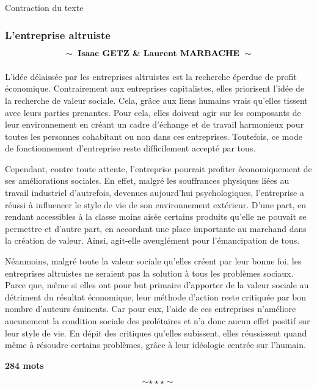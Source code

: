 \newpage\begin{bclogo}[barre=none,logo={}]{Contraction du texte} 
	\begin{center}
		\subsubsection*{L'entreprise altruiste  $$\sim\ \text{{\bfseries Isaac GETZ \& Laurent MARBACHE}}\ \sim$$}
	\end{center}
\end{bclogo}

	\hspace*{0.5cm}L'idée délaissée par les entreprises altruistes est la recherche éperdue de profit économique. Contrairement aux entreprises capitalistes, elles priorisent l'idée de la recherche de valeur sociale. Cela, grâce aux liens humains vrais qu'elles tissent avec leurs parties prenantes. Pour cela, elles doivent agir sur les composants de leur environnement en créant un cadre d'échange et de travail harmonieux pour toutes les personnes cohabitant ou non dans ces entreprises. Toutefois, ce mode de fonctionnement d'entreprise reste difficilement accepté par tous.\newline
	
	\hspace*{0.5cm}Cependant, contre toute attente, l'entreprise pourrait profiter économiquement de ses améliorations sociales. En effet, malgré les souffrances physiques liées au travail industriel d'autrefois, devenues aujourd'hui psychologiques, l'entreprise a réussi à influencer le style de vie de son environnement extérieur. D'une part, en rendant accessibles à la classe moins aisée certains produits qu'elle ne pouvait se permettre et d'autre part, en accordant une place importante au marchand dans la création de valeur. Ainsi, agit-elle aveuglément pour l'émancipation de tous.\newline
	
	\hspace*{0.5cm}Néanmoins, malgré toute la valeur sociale qu'elles créent par leur bonne foi, les entreprises altruistes ne seraient pas la solution à tous les problèmes sociaux. Parce que, même si elles ont pour but primaire d'apporter de la valeur sociale au détriment du résultat économique, leur méthode d'action reste critiquée par bon nombre d'auteurs éminents. Car pour eux, l'aide de ces entreprises n'améliore aucunement la condition sociale des prolétaires et n'a donc aucun effet positif sur leur style de vie. En dépit des critiques qu'elles subissent, elles réussissent quand même à résoudre certains problèmes, grâce à leur idéologie centrée sur l'humain.
	
\begin{center}
	{\textbf{284 mots}}
\end{center}
$$\sim\star \star \star\sim$$

